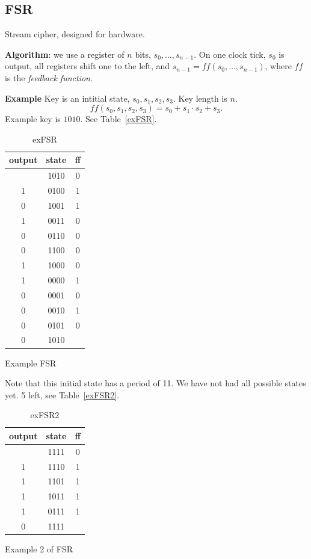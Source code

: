 \documentclass[language=english,number=]{homework}
\begin{document}
    \subsection{FSR}

    Stream cipher, designed for hardware.

    \textbf{Algorithm}: we use a register of $n$ bits, $s_0, \dots, s_{n-1}$.
    On one clock tick, $s_0$ is output, all registers shift one to the left, and $s_{n-1} = ff(s_0, \dots, s_{n-1})$, where $ff$ is the \textit{feedback function}.

    \textbf{Example}
    Key is an intitial state, $s_0, s_1, s_2, s_3$.
    Key length is $n$.
    \[
        ff(s_0, s_1, s_2, s_3) = s_0 + s_1 \cdot s_2 + s_3.
    \]
    Example key is $1010$.
    See Table~\ref{exFSR}.

    \begin{table}
        \centering
        \begin{tabular}{c|c|c}
            output & state & ff \\ \hline
            & 1010 &0 \\
            1 & 0100 & 1 \\
            0 & 1001 & 1 \\
            1 & 0011 & 0 \\
            0 & 0110 & 0 \\
            0 & 1100 & 0 \\
            1 & 1000 & 0 \\
            1 & 0000 & 1 \\
            0 & 0001 & 0 \\
            0 & 0010 & 1 \\
            0 & 0101 & 0 \\
            0 & 1010 & \\
        \end{tabular}
        \caption{Example FSR}
        \caption{exFSR}
    \end{table}
    Note that this initial state has a period of 11.
    We have not had all possible states yet.
    5 left, see Table~\ref{exFSR2}.

    \begin{table}
        \centering
        \begin{tabular}{c|c|c}
            output & state & ff \\ \hline
            & 1111 & 0 \\
            1 & 1110 & 1 \\
            1 & 1101 & 1 \\
            1 & 1011 & 1 \\
            1 & 0111 & 1 \\
            0 & 1111 &
        \end{tabular}
        \caption{Example 2 of FSR}
        \caption{exFSR2}
    \end{table}
\end{document}
